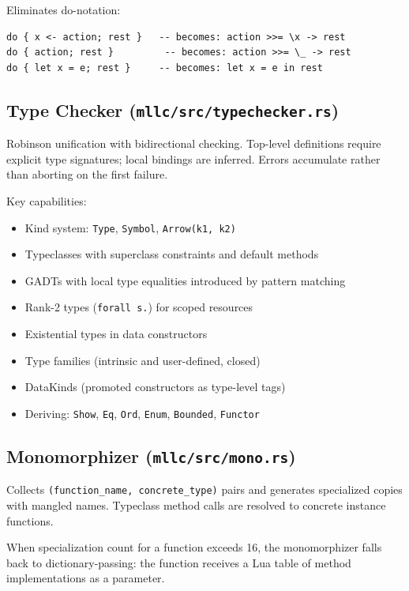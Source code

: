 \documentclass[11pt,a4paper]{article}
\begin{document}
Eliminates do-notation:
\begin{lstlisting}[language=MLL]
do { x <- action; rest }   -- becomes: action >>= \x -> rest
do { action; rest }         -- becomes: action >>= \_ -> rest
do { let x = e; rest }     -- becomes: let x = e in rest
\end{lstlisting}

\subsection{Type Checker (\texttt{mllc/src/typechecker.rs})}

Robinson unification with bidirectional checking.  Top-level definitions require
explicit type signatures; local bindings are inferred.  Errors accumulate rather
than aborting on the first failure.

Key capabilities:
\begin{itemize}[nosep]
  \item Kind system: \texttt{Type}, \texttt{Symbol}, \texttt{Arrow(k1, k2)}
  \item Typeclasses with superclass constraints and default methods
  \item GADTs with local type equalities introduced by pattern matching
  \item Rank-2 types (\texttt{forall s.}) for scoped resources
  \item Existential types in data constructors
  \item Type families (intrinsic and user-defined, closed)
  \item DataKinds (promoted constructors as type-level tags)
  \item Deriving: \texttt{Show}, \texttt{Eq}, \texttt{Ord}, \texttt{Enum},
        \texttt{Bounded}, \texttt{Functor}
\end{itemize}

\subsection{Monomorphizer (\texttt{mllc/src/mono.rs})}

Collects \texttt{(function\_name, concrete\_type)} pairs and generates
specialized copies with mangled names.  Typeclass method calls are resolved to
concrete instance functions.

When specialization count for a function exceeds 16, the monomorphizer falls back
to dictionary-passing: the function receives a Lua table of method
implementations as a parameter.
\end{document}
